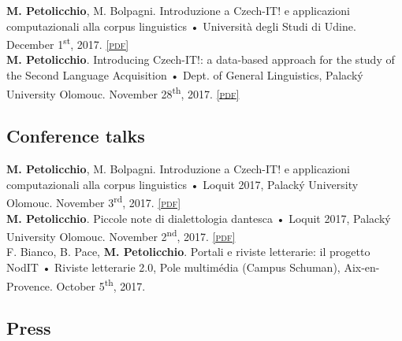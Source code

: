 \documentclass[10pt, a4paper]{article}
\newcommand{\pdf}[1]{\href{#1}{\scriptsize\textsc{[pdf]}}}
\begin{document}
\textbf{M. Petolicchio}, M. Bolpagni. Introduzione a Czech-IT! e applicazioni computazionali alla corpus linguistics • Università degli Studi di Udine. December 1\textsuperscript{st}, 2017. \pdf{http://www.academia.edu/35315516/_UniUD_1_12_2017_Introduzione_a_Czech-IT_e_applicazioni_computazionali_alla_corpus_linguistics} \\

\textbf{M. Petolicchio}. Introducing Czech-IT!: a data-based approach for the study of the Second Language Acquisition • Dept. of General Linguistics, Palacký University Olomouc. November 28\textsuperscript{th}, 2017. \pdf{http://www.academia.edu/35278761/Introducing_Czech-IT_a_data-based_approach_for_the_study_of_the_Second_Language_Acquisition} 


\subsection{Conference talks}



\textbf{M. Petolicchio}, M. Bolpagni. Introduzione a Czech-IT! e applicazioni computazionali alla corpus linguistics • Loquit 2017, Palacký University Olomouc. November 3\textsuperscript{rd}, 2017. \pdf{http://www.academia.edu/35256167/Introduzione_a_Czech-IT_e_applicazioni_computazionali_alla_corpus_linguistics} \\

\textbf{M. Petolicchio}. Piccole note di dialettologia dantesca • Loquit 2017, Palacký University Olomouc. November 2\textsuperscript{nd}, 2017. \pdf{http://www.academia.edu/35256139/Piccole_note_di_dialettologia_dantesca} \\

F. Bianco, B. Pace, \textbf{M. Petolicchio}. Portali e riviste letterarie: il progetto NodIT • Riviste letterarie 2.0, Pole multimédia (Campus Schuman), Aix-en-Provence. October 5\textsuperscript{th}, 2017. 








\subsection{Press}
\end{document}
